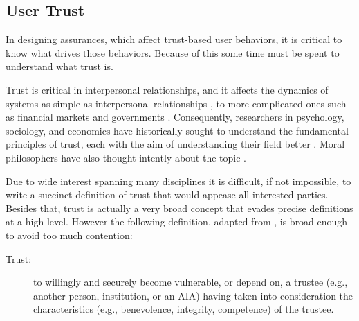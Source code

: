 \subsection{User Trust}
    In designing assurances, which affect trust-based user behaviors, it is critical to know what drives those behaviors. Because of this some time must be spent to understand what trust is. 

    Trust is critical in interpersonal relationships, and it affects the dynamics of systems as simple as interpersonal relationships \cite{Lewicki2006-hj}, to more complicated ones such as financial markets and governments \cite{Fukuyama1995-un}. Consequently, researchers in psychology, sociology, and economics have historically sought to understand the fundamental principles of trust, each with the aim of understanding their field better \cite{Gambetta1988-pi}. Moral philosophers have also thought intently about the topic \cite{Baier1986-im}.

    Due to wide interest spanning many disciplines it is difficult, if not impossible, to write a succinct definition of trust that would appease all interested parties. Besides that, trust is actually a very broad concept that evades precise definitions at a high level. However the following definition, adapted from \cite{McKnight2004-vv}, is broad enough to avoid too much contention:

    \begin{description}
        \item [Trust:] to willingly and securely become vulnerable, or depend on, a trustee (e.g., another person, institution, or an AIA) having taken into consideration the characteristics (e.g., benevolence, integrity, competence) of the trustee.
    \end{description}

